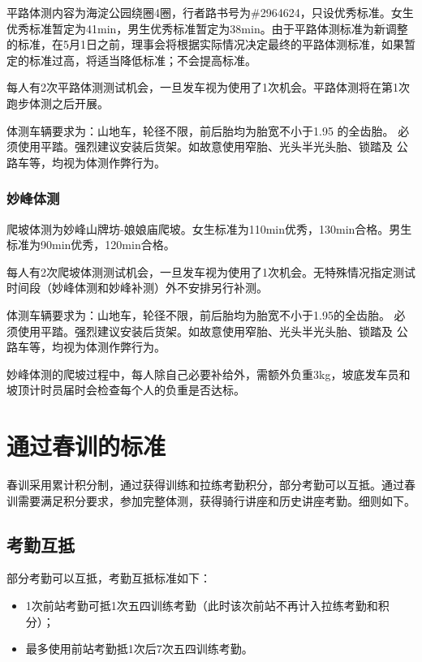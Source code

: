 \documentclass[UTF8]{ctexart}
\begin{document}
平路体测内容为海淀公园绕圈4圈，行者路书号为\#2964624，只设优秀标准。女生优秀标准暂定为41min，男生优秀标准暂定为38min。由于平路体测标准为新调整的标准，在5月1日之前，理事会将根据实际情况决定最终的平路体测标准，如果暂定的标准过高，将适当降低标准；不会提高标准。

每人有2次平路体测测试机会，一旦发车视为使用了1次机会。平路体测将在第1次跑步体测之后开展。

体测车辆要求为：山地车，轮径不限，前后胎均为胎宽不小于1.95 的全齿胎。
必须使用平踏。强烈建议安装后货架。如故意使用窄胎、光头半光头胎、锁踏及
公路车等，均视为体测作弊行为。

\subsubsection{妙峰体测}

爬坡体测为妙峰山牌坊-娘娘庙爬坡。女生标准为110min优秀，130min合格。男生标准为90min优秀，120min合格。

每人有2次爬坡体测测试机会，一旦发车视为使用了1次机会。无特殊情况指定测试时间段（妙峰体测和妙峰补测）外不安排另行补测。

体测车辆要求为：山地车，轮径不限，前后胎均为胎宽不小于1.95的全齿胎。
必须使用平踏。强烈建议安装后货架。如故意使用窄胎、光头半光头胎、锁踏及
公路车等，均视为体测作弊行为。

妙峰体测的爬坡过程中，每人除自己必要补给外，需额外负重3kg，坡底发车员和坡顶计时员届时会检查每个人的负重是否达标。

\section{通过春训的标准}

春训采用累计积分制，通过获得训练和拉练考勤积分，部分考勤可以互抵。通过春训需要满足积分要求，参加完整体测，获得骑行讲座和历史讲座考勤。细则如下。

\subsection{考勤互抵}

部分考勤可以互抵，考勤互抵标准如下：

\begin{itemize}[nosep,left=4em]
    \item 1次前站考勤可抵1次五四训练考勤（此时该次前站不再计入拉练考勤和积分）；
    \item 最多使用前站考勤抵1次后7次五四训练考勤。 
\end{itemize}
\end{document}
